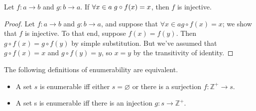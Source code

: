 \documentclass{article}
\begin{document}
\begin{lemma}
Let $f: a \rightarrow b$ and $g: b \rightarrow a$. If $\forall x \in a \hspace{0.1cm} g \circ f(x) = x$, then $f$ is injective. \end{lemma}
\begin{proof}
Let $f: a \rightarrow b$ and $g: b \rightarrow a$, and suppose that $\forall x \in a g \circ f(x) = x$; we show that $f$ is injective. To that end, suppose $f(x) = f(y)$. Then $g \circ f(x) = g \circ f(y)$ by simple substitution. But we've assumed that $g \circ f(x) = x$ and $g \circ f(y) = y$, so $x = y$ by the transitivity of identity.
\end{proof}

\begin{proposition} The following definitions of enumerability are equivalent.
\begin{itemize}
\item A set $s$ is enumerable iff either $s = \varnothing$ or there is a surjection $f : \mathbb{Z^+} \rightarrow s$.
\item A set s is enumerable iff there is an injection $g: s \rightarrow \mathbb{Z^+}$.
\end{itemize}
\end{proposition}
\end{document}

